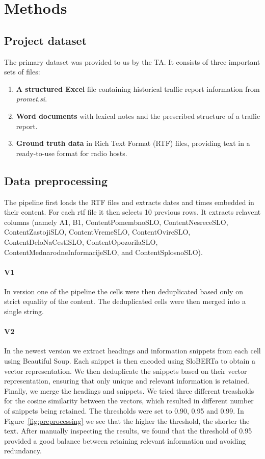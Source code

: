 \documentclass[fleqn,moreauthors,10pt]{ds_report}
\begin{document}
\section{Methods}

\subsection*{Project dataset}

The primary dataset was provided to us by the TA. It consists of three important sets of files:

\begin{enumerate}
    \item \textbf{A structured Excel }file containing historical traffic report information from \textit{promet.si}.
    \item \textbf{Word documents} with lexical notes and the prescribed structure of a traffic report.
    \item \textbf{Ground truth data} in Rich Text Format (RTF) files, providing text in a ready-to-use format for radio hosts.
\end{enumerate}


\subsection*{Data preprocessing}


The pipeline first loads the RTF files and extracts dates and times embedded in their content. For each rtf file it then selects 10 previous rows. It extracts relavent columns (namely A1, B1, ContentPomembnoSLO, ContentNesreceSLO, ContentZastojiSLO, ContentVremeSLO, ContentOvireSLO, ContentDeloNaCestiSLO, ContentOpozorilaSLO, ContentMednarodneInformacijeSLO, and ContentSplosnoSLO).

\paragraph{V1}
In version one of the pipeline the cells were then deduplicated based only on strict equality of the content. The deduplicated cells were then merged into a single string.

\paragraph{V2}
In the newest version we extract headings and information snippets from each cell using Beautiful Soup. Each snippet is then encoded using SloBERTa \cite{SloBERTa} to obtain a vector representation. We then deduplicate the snippets based on their vector representation, ensuring that only unique and relevant information is retained. Finally, we merge the headings and snippets.
We tried three different treasholds for the cosine similarity between the vectors, which resulted in different number of snippets being retained. The thresholds were set to 0.90, 0.95 and 0.99. In Figure~\ref{fig:preprocessing} we see that the higher the threshold, the shorter the text. After manually inspecting the results, we found that the threshold of 0.95 provided a good balance between retaining relevant information and avoiding redundancy.
\end{document}
